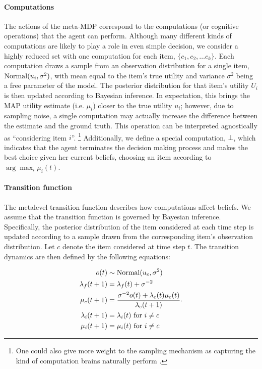 \documentclass[12pt,a4paperpaper,]{article}
\begin{document}
\paragraph{Computations}
The actions of the meta-MDP correspond to the computations (or cognitive operations) that the agent can perform. Although many different kinds of computations are likely to play a role in even simple decision, we consider a highly reduced set with one computation for each item, $\{c_1, c_2, \dots c_k \}$. Each computation draws a sample from an observation distribution for a single item, $\mathrm{Normal}(u_i, \sigma^2)$, with mean equal to the item's true utility and variance $\sigma^2$ being a free parameter of the model. The posterior distribution for that item's utility $U_i$ is then updated according to Bayesian inference. In expectation, this brings the MAP utility estimate (i.e. $\mu_i$) closer to the true utility $u_i$; however, due to sampling noise, a single computation may actually increase the difference between the estimate and the ground truth. This operation can be interpreted agnostically as ``considering item $i$''.%
  \footnote{One could also give more weight to the sampling mechanism as capturing the kind of computation brains naturally perform \citep{sanborn16}.}
Additionally, we define a special computation, $\bot$, which indicates that the agent terminates the decision making process and makes the best choice given her current beliefs, choosing an item according to $\arg\max_i \mu_i(t)$.

\paragraph{Transition function}
The metalevel transition function describes how computations affect beliefs. We assume that the transition function is governed by Bayesian inference. Specifically, the posterior distribution of the item considered at each time step is updated according to a sample drawn from the corresponding item's observation distribution. Let $c$ denote the item considered at time step $t$. The transition dynamics are then defined by the following equations:

\begin{equation}
\begin{aligned}
  o(t) &\sim \mathrm{Normal}(u_{c}, \sigma^2) \\
  \lambda_f(t+1) &= \lambda_f(t) + \sigma^{-2}  \\
  \mu_{c}(t+1) &= \frac{\sigma^{-2} o(t) + \lambda_{c}(t) \mu_{c}(t)}{\lambda_{c}(t+1)}  \\
  \lambda_i(t+1) &= \lambda_i(t) \text{ for } i \neq c  \\
  \mu_i(t+1) &= \mu_i(t) \text{ for } i \neq c  \\
\end{aligned}
.
\end{equation}
\end{document}
